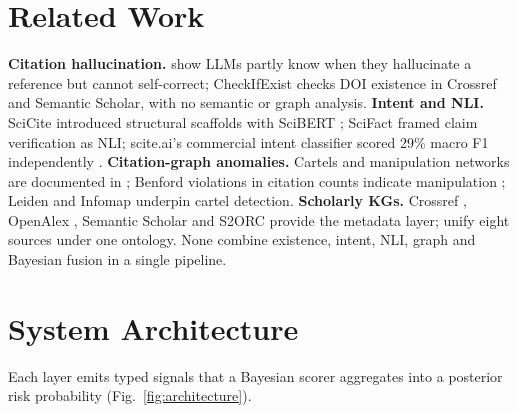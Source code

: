 \documentclass[letterpaper]{article} %
\begin{document}
\section{Related Work}

\textbf{Citation hallucination.} \citet{agrawal2024language} show LLMs partly know when they hallucinate a reference but cannot self-correct; CheckIfExist \cite{abbonato2026checkifexist} checks DOI existence in Crossref and Semantic Scholar, with no semantic or graph analysis. \textbf{Intent and NLI.} SciCite \cite{cohan2019structural} introduced structural scaffolds with SciBERT \cite{beltagy2019scibert}; SciFact \cite{wadden2020fact} framed claim verification as NLI; scite.ai's commercial intent classifier scored 29\% macro F1 independently \cite{bakker2023evaluating}. \textbf{Citation-graph anomalies.} Cartels and manipulation networks are documented in \cite{fister2016toward,kojaku2021}; Benford violations in citation counts indicate manipulation \cite{campanario2011benford}; Leiden \cite{traag2019leiden} and Infomap \cite{rosvall2008infomap} underpin cartel detection. \textbf{Scholarly KGs.} Crossref \cite{hendricks2020crossref}, OpenAlex \cite{priem2022openalex}, Semantic Scholar \cite{kinney2023semantic,ammar2018construction} and S2ORC \cite{lo2020s2orc} provide the metadata layer; \citet{wilinski2026datalake} unify eight sources under one ontology. None combine existence, intent, NLI, graph and Bayesian fusion in a single pipeline.

\section{System Architecture}

Each layer emits typed signals that a Bayesian scorer aggregates into a posterior risk probability (Fig.~\ref{fig:architecture}).
\end{document}
